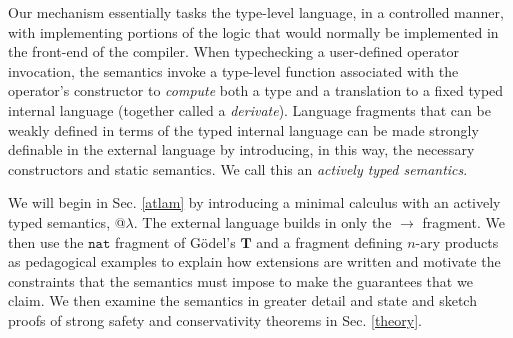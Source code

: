 \documentclass[9pt,preprint]{sigplanconf}
\begin{document}
Our mechanism essentially tasks the type-level language, in a controlled manner, with implementing portions of the logic that would normally be implemented in the front-end of the compiler. When typechecking a user-defined operator invocation, the semantics invoke a type-level function associated with the operator's constructor to \emph{compute} both a type and a translation to a fixed typed internal language (together called a \emph{derivate}). Language fragments that can be weakly defined in terms of the typed internal language can be made strongly definable in the external language by introducing, in this way, the necessary  constructors and static semantics. We call this an \emph{actively typed semantics}.

We will begin in Sec. \ref{atlam} by introducing a minimal calculus with an actively typed semantics, @$\lambda$. The external language builds in only the $\rightarrow$ fragment. We then use the $\mathtt{nat}$ fragment of G\"odel's $\mathbf{T}$ and a fragment defining $n$-ary products as pedagogical examples to explain how extensions are written and motivate the constraints that the semantics must impose to make the guarantees that we claim. We then examine the semantics in greater detail and state and sketch proofs of strong safety and conservativity theorems in Sec. \ref{theory}. 
\end{document}
